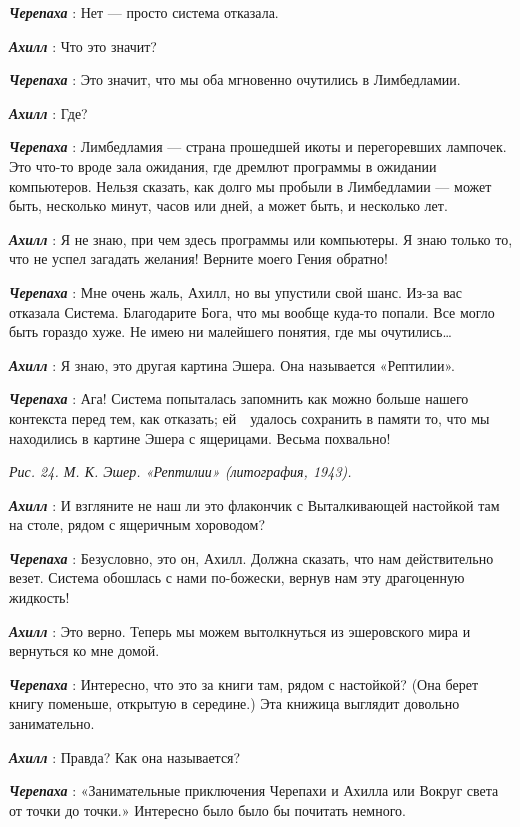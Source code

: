 \emph{\textbf{Черепаха}} : Нет --- просто система отказала.

\emph{\textbf{Ахилл}} : Что это значит?

\emph{\textbf{Черепаха}} : Это значит, что мы оба мгновенно очутились в Лимбедламии.

\textbf{\emph{Ахилл}} : Где?

\emph{\textbf{Черепаха}} : Лимбедламия --- страна прошедшей икоты и перегоревших лампочек. Это что-то вроде зала ожидания, где дремлют программы в ожидании компьютеров. Нельзя сказать, как долго мы пробыли в Лимбедламии --- может быть, несколько минут, часов или дней, а может быть, и несколько лет.

\emph{\textbf{Ахилл}} : Я не знаю, при чем здесь программы или компьютеры. Я знаю только то, что не успел загадать желания! Верните моего Гения обратно!

\emph{\textbf{Черепаха}} : Мне очень жаль, Ахилл, но вы упустили свой шанс. Из-за вас отказала Система. Благодарите Бога, что мы вообще куда-то попали. Все могло быть гораздо хуже. Не имею ни малейшего понятия, где мы очутились\ldots{}

\emph{\textbf{Ахилл}} : Я знаю, это другая картина Эшера. Она называется «Рептилии».

\emph{\textbf{Черепаха}} : Ага! Система попыталась запомнить как можно больше нашего контекста перед тем, как отказать; ей~~удалось сохранить в памяти то, что мы находились в картине Эшера с ящерицами. Весьма похвально!

\emph{Рис. 24. М. К. Эшер. «Рептилии» (литография, 1943).}

\emph{\textbf{Ахилл}} : И взгляните не наш ли это флакончик с Выталкивающей настойкой там на столе, рядом с ящеричным хороводом?

\emph{\textbf{Черепаха}} : Безусловно, это он, Ахилл. Должна сказать, что нам действительно везет. Система обошлась с нами по-божески, вернув нам эту драгоценную жидкость!

\emph{\textbf{Ахилл}} : Это верно. Теперь мы можем вытолкнуться из эшеровского мира и вернуться ко мне домой.

\emph{\textbf{Черепаха}} : Интересно, что это за книги там, рядом с настойкой? (Она берет книгу поменьше, открытую в середине.) Эта книжица выглядит довольно занимательно.

\emph{\textbf{Ахилл}} : Правда? Как она называется?

\emph{\textbf{Черепаха}} : «Занимательные приключения Черепахи и Ахилла или Вокруг света от точки до точки.» Интересно было было бы почитать немного.

